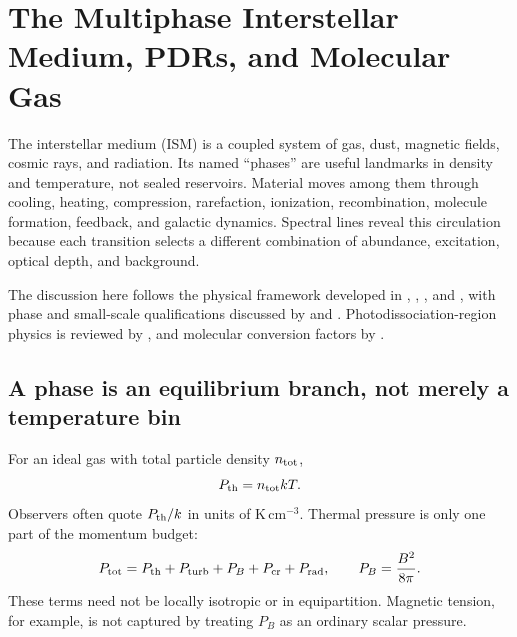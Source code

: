 
\chapter{The Multiphase Interstellar Medium, PDRs, and Molecular Gas}
\label{chap:ism-pdr-molecular}

The interstellar medium (ISM) is a coupled system of gas, dust, magnetic fields,
cosmic rays, and radiation.  Its named ``phases'' are useful landmarks in density and
temperature, not sealed reservoirs.  Material moves among them through cooling,
heating, compression, rarefaction, ionization, recombination, molecule formation,
feedback, and galactic dynamics.  Spectral lines reveal this circulation because each
transition selects a different combination of abundance, excitation, optical depth,
and background.

The discussion here follows the physical framework developed in
\citet{Spitzer1978}, \citet{McKeeOstriker1977}, \citet{Draine2011}, and
\citet{Tielens2005}, with phase and small-scale qualifications discussed by
\citet{Cox2005} and \citet{StanimirovicZweibel2018}.  Photodissociation-region physics
is reviewed by \citet{HollenbachTielens1999}, and molecular conversion factors by
\citet{BolattoWolfireLeroy2013}.

\section{A phase is an equilibrium branch, not merely a temperature bin}

For an ideal gas with total particle density $n_{\rm tot}$,
\begin{equation}
 P_{\rm th}=n_{\rm tot}kT.
 \label{eq:thermal-pressure}
\end{equation}
Observers often quote $P_{\rm th}/k$ in units of
$\mathrm{K\,cm^{-3}}$.  Thermal pressure is only one part of the momentum budget:
\begin{equation}
 P_{\rm tot}=P_{\rm th}+P_{\rm turb}+P_B+P_{\rm cr}+P_{\rm rad},
 \qquad P_B=\frac{B^2}{8\pi}.
 \label{eq:total-ism-pressure}
\end{equation}
These terms need not be locally isotropic or in equipartition.  Magnetic tension, for
example, is not captured by treating $P_B$ as an ordinary scalar pressure.

